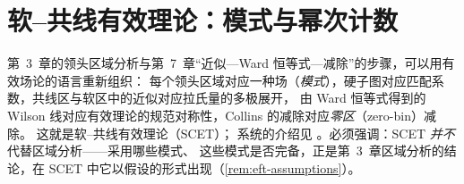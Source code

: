 \providecommand{\nslash}{\sla{n}}
\providecommand{\nbslash}{\bar{\sla{n}}}
\providecommand{\Pbar}{\bar{\mathcal P}}
\providecommand{\Pperp}{\mathcal P_{\perp}}

\section{软–共线有效理论：模式与幂次计数}\label{sec:scet-modes}

第~3~章的领头区域分析与第~7~章“近似—Ward 恒等式—减除”的步骤，可以用有效场论的语言重新组织：
每个领头区域对应一种场（\emph{模式}），硬子图对应匹配系数，共线区与软区中的近似对应拉氏量的多极展开，
由 Ward 恒等式得到的 Wilson 线对应有效理论的规范对称性，Collins 的减除对应\emph{零区}（zero-bin）减除。
这就是软–共线有效理论（SCET）\cite{BauerFlemingLuke2000,BauerEtAl2001,BauerStewart2001,BauerPirjolStewart2002,BauerEtAl2002}；
系统的介绍见 \cite{BecherBroggioFerroglia2015}。必须强调：SCET \emph{并不}代替区域分析——采用哪些模式、
这些模式是否完备，正是第~3~章区域分析的结论，在 SCET 中它以假设的形式出现（\cref{rem:eft-assumptions}）。

